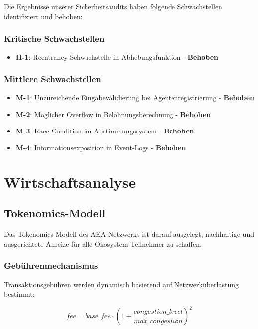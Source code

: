 \documentclass[12pt,a4paper]{article}
\begin{document}
Die Ergebnisse unserer Sicherheitsaudits haben folgende Schwachstellen identifiziert und behoben:

\subsubsection{Kritische Schwachstellen}
\begin{itemize}
\item \textbf{H-1}: Reentrancy-Schwachstelle in Abhebungsfunktion - \textbf{Behoben}
\end{itemize}

\subsubsection{Mittlere Schwachstellen}
\begin{itemize}
\item \textbf{M-1}: Unzureichende Eingabevalidierung bei Agentenregistrierung - \textbf{Behoben}
\item \textbf{M-2}: Möglicher Overflow in Belohnungsberechnung - \textbf{Behoben}
\item \textbf{M-3}: Race Condition im Abstimmungssystem - \textbf{Behoben}
\item \textbf{M-4}: Informationsexposition in Event-Logs - \textbf{Behoben}
\end{itemize}

\section{Wirtschaftsanalyse}

\subsection{Tokenomics-Modell}

Das Tokenomics-Modell des AEA-Netzwerks ist darauf ausgelegt, nachhaltige und ausgerichtete Anreize für alle Ökosystem-Teilnehmer zu schaffen.

\subsubsection{Gebührenmechanismus}

Transaktionsgebühren werden dynamisch basierend auf Netzwerküberlastung bestimmt:

\begin{equation}
fee = base\_fee \cdot (1 + \frac{congestion\_level}{max\_congestion})^2
\end{equation}
\end{document}
